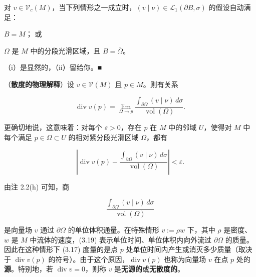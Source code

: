 \begin{remark}

\begin{items}
\item

对 $ v \in \mathcal{V}_c(M) $，当下列情形之一成立时，$ (v \mid \nu) \in \mathcal{L}_1(\partial B,\sigma) $ 的假设自动满足：

\begin{subitems}
\item

$ B = M $；
或

\item

$ \Omega $ 是 $ M $ 中的分段光滑区域，且 $ B = \overline{\Omega} $。

\proofhead
（i）是显然的，（ii）留给你。\nobreak\hspace{0.35em}■
\end{subitems}

\item

（\textbf{散度的物理解释}）设 $ v \in \mathcal{V}(M) $ 且 $ p \in M $。则有关系

\begin{equation}
\operatorname{div} v(p) = \lim_{\Omega \to p} \frac{\int_{\partial\Omega} (v \mid \nu)\, d\sigma}{\operatorname{vol}(\Omega)}.\tag{3.17}
\end{equation}

更确切地说，这意味着：对每个 $ \varepsilon > 0 $，存在 $ p $ 在 $ M $ 中的邻域 $ U $，使得对 $ M $ 中每个满足 $ p \in \Omega \subset U $ 的相对紧分段光滑区域 $ \Omega $，都有

\begin{equation}
\left| \operatorname{div} v(p) - \frac{\int_{\partial\Omega} (v \mid \nu)\, d\sigma}{\operatorname{vol}(\Omega)} \right| < \varepsilon.\tag{3.18}
\end{equation}

由注 2.2(h) 可知，商

\begin{equation}
\frac{\int_{\partial\Omega} (v \mid \nu)\, d\sigma}{\operatorname{vol}(\Omega)}\tag{3.19}
\end{equation}

是向量场 $ v $ 通过 $ \partial\Omega $ 的单位体积通量。在特殊情形 $ v := \rho w $ 下，其中 $ \rho $ 是密度、$ w $ 是 $ M $ 中流体的速度，(3.19) 表示单位时间、单位体积内向外流过 $ \partial\Omega $ 的质量。因此在这种情形下 (3.17) 度量的是点 $ p $ 处单位时间内产生或消灭多少质量（取决于 $ \operatorname{div} v(p) $ 的符号）。由于这个原因，$ \operatorname{div} v(p) $ 也称为向量场 $ v $ 在点 $ p $ 处的\textbf{源}。特别地，若 $ \operatorname{div} v = 0 $，则称 $ v $ 是\textbf{无源的}或\textbf{无散度的}。


\end{items}
\end{remark}
